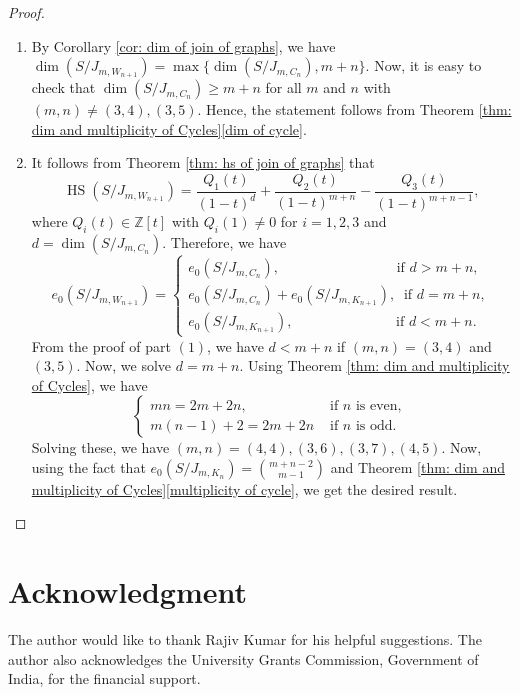 \documentclass[12pt,reqno]{amsart}
\newcommand \hs{\operatorname{HS}}
\theoremstyle{plain}
\theoremstyle{definition}
\begin{document}
\begin{proof} 
    \begin{enumerate}
        \item By Corollary \ref{cor: dim of join of graphs}, we have $\dim(S/J_{m,W_{n+1}})=\max\{\dim(S/J_{m,C_n}),m+n\}$. Now, it is easy to check that $\dim(S/J_{m,C_n})\geq m+n$ for all $m$ and $n$ with $(m,n)\neq (3,4) ,(3,5)$. Hence, the statement follows from Theorem \ref{thm: dim and multiplicity of Cycles}\eqref{dim of cycle}.
        \item  It follows from Theorem \ref{thm: hs of join of graphs} that \begin{equation}\label{Eq: Hilbert series of wheel graph}
        \hs(S/J_{m,W_{n+1}})=\frac{Q_1(t)}{(1-t)^d}+\frac{Q_2(t)}{(1-t)^{m+n}}-\frac{Q_3(t)}{(1-t)^{m+n-1}},
    \end{equation}
    where $Q_i(t)\in \mathbb Z[t]$ with $Q_i(1)\neq 0$ for $i=1,2,3$ and $d=\dim(S/J_{m,C_n})$. Therefore, we have $$e_0(S/J_{m,W_{n+1}})=\begin{cases}
            e_0(S/J_{m,C_n}),\qquad\qquad \qquad\qquad\text{ if $d>m+n$},\\
            e_0(S/J_{m,C_n})+e_0(S/J_{m,K_{n+1}}),~\text{ if $d=m+n$},\\
            e_0(S/J_{m,K_{n+1}}), \quad\qquad\qquad\qquad\text{ if $d<m+n$}.
        \end{cases}$$ 
        From the proof of part $(1)$, we have $d<m+n$ if $(m,n)=(3,4)$ and $(3,5)$. Now, we solve $d=m+n$. Using Theorem \ref{thm: dim and multiplicity of Cycles}, we have 
        $$\begin{cases}
         mn=2m+2n,& \text{ if $n$ is even, }\\
         m(n-1)+2=2m+2n&  \text{ if $n$ is odd}.
        \end{cases}$$
Solving these, we have $(m,n)=(4,4),(3,6),(3,7),(4,5)$. Now, using the fact that $e_0(S/J_{m,K_n})=\binom{m+n-2}{m-1}$ and Theorem \ref{thm: dim and multiplicity of Cycles}\eqref{multiplicity of cycle}, we get the desired result. 
    \end{enumerate}
\end{proof}
\section*{Acknowledgment}
 The author would like to thank Rajiv Kumar for his helpful suggestions. The author also acknowledges the University Grants Commission, Government of India, for the financial support.


	
\end{document}
